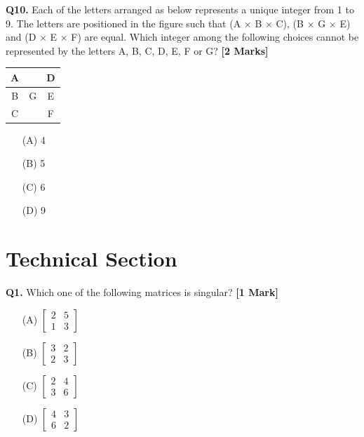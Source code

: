 \documentclass[11pt]{article}
\newcommand{\questiona}[2]{
    \noindent\textbf{Q#2.} #1 \hfill \textbf{[1 Mark]}
}
\newcommand{\questionb}[2]{
    \noindent\textbf{Q#2.} #1 \hfill \textbf{[2 Marks]}
}
\begin{document}
\questionb{Each of the letters arranged as below represents a unique integer from 1 to 9. The letters are positioned in the figure such that (A × B × C), (B × G × E) and (D × E × F) are equal. Which integer among the following choices cannot be represented by the letters A, B, C, D, E, F or G?}{10}

\begin{tabular}{|c|c|c}
\hline
A &  &D \\
\hline
B & G & E \\
\hline
C &  &F \\
\hline
\end{tabular}

\begin{enumerate}
    \item[(A)] 4  
    \item[(B)] 5  
    \item[(C)] 6  
    \item[(D)] 9  
\end{enumerate}
\vspace{0.5cm}

\section*{Technical Section}

\questiona{Which one of the following matrices is singular?}{1}
\begin{enumerate}
    \item[(A)] $\begin{bmatrix} 2 & 5 \\ 1 & 3 \end{bmatrix}$
    \item[(B)] $\begin{bmatrix} 3 & 2 \\ 2 & 3 \end{bmatrix}$
    \item[(C)] $\begin{bmatrix} 2 & 4 \\ 3 & 6 \end{bmatrix}$
    \item[(D)] $\begin{bmatrix} 4 & 3 \\ 6 & 2 \end{bmatrix}$
\end{enumerate}
\vspace{0.5cm}
\end{document}
